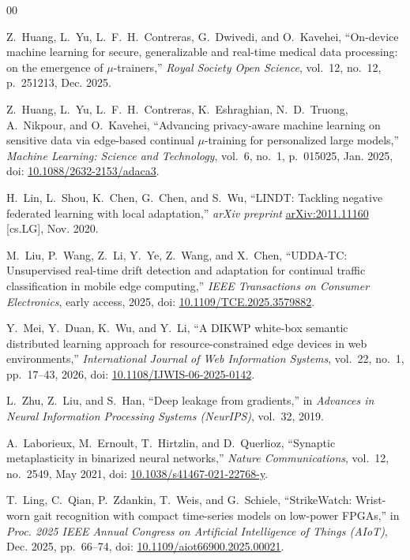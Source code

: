 \documentclass[conference]{IEEEtran}
\begin{document}
\begin{thebibliography}{00}

Z.~Huang, L.~Yu, L.~F.~H.~Contreras, G.~Dwivedi, and O.~Kavehei,
``On-device machine learning for secure, generalizable and real-time
medical data processing: on the emergence of $\mu$-trainers,''
\textit{Royal Society Open Science}, vol.~12, no.~12, p.~251213,
Dec. 2025.

Z.~Huang, L.~Yu, L.~F.~H.~Contreras, K.~Eshraghian, N.~D.~Truong,
A.~Nikpour, and O.~Kavehei,
``Advancing privacy-aware machine learning on sensitive data via
edge-based continual $\mu$-training for personalized large models,''
\textit{Machine Learning: Science and Technology}, vol.~6, no.~1,
p.~015025, Jan. 2025,
doi: \href{https://doi.org/10.1088/2632-2153/adaca3}{10.1088/2632-2153/adaca3}.

H.~Lin, L.~Shou, K.~Chen, G.~Chen, and S.~Wu,
``LINDT: Tackling negative federated learning with local adaptation,''
\textit{arXiv preprint} \href{https://arxiv.org/abs/2011.11160}{arXiv:2011.11160} [cs.LG], Nov. 2020.

M.~Liu, P.~Wang, Z.~Li, Y.~Ye, Z.~Wang, and X.~Chen,
``UDDA-TC: Unsupervised real-time drift detection and adaptation for
continual traffic classification in mobile edge computing,''
\textit{IEEE Transactions on Consumer Electronics}, early access,
2025, doi: \href{https://doi.org/10.1109/TCE.2025.3579882}{10.1109/TCE.2025.3579882}.

Y.~Mei, Y.~Duan, K.~Wu, and Y.~Li,
``A DIKWP white-box semantic distributed learning approach for
resource-constrained edge devices in web environments,''
\textit{International Journal of Web Information Systems},
vol.~22, no.~1, pp.~17--43, 2026,
doi: \href{https://doi.org/10.1108/IJWIS-06-2025-0142}{10.1108/IJWIS-06-2025-0142}.

L.~Zhu, Z.~Liu, and S.~Han,
``Deep leakage from gradients,''
in \textit{Advances in Neural Information Processing Systems
(NeurIPS)}, vol.~32, 2019.

A.~Laborieux, M.~Ernoult, T.~Hirtzlin, and D.~Querlioz,
``Synaptic metaplasticity in binarized neural networks,''
\textit{Nature Communications}, vol.~12, no.~2549, May 2021,
doi: \href{https://doi.org/10.1038/s41467-021-22768-y}{10.1038/s41467-021-22768-y}.

T.~Ling, C.~Qian, P.~Zdankin, T.~Weis, and G.~Schiele,
``StrikeWatch: Wrist-worn gait recognition with compact time-series
models on low-power FPGAs,''
in \textit{Proc. 2025 IEEE Annual Congress on Artificial Intelligence
of Things (AIoT)}, Dec. 2025, pp.~66--74,
doi: \href{https://doi.org/10.1109/aiot66900.2025.00021}{10.1109/aiot66900.2025.00021}.


\end{thebibliography}
\end{document}
